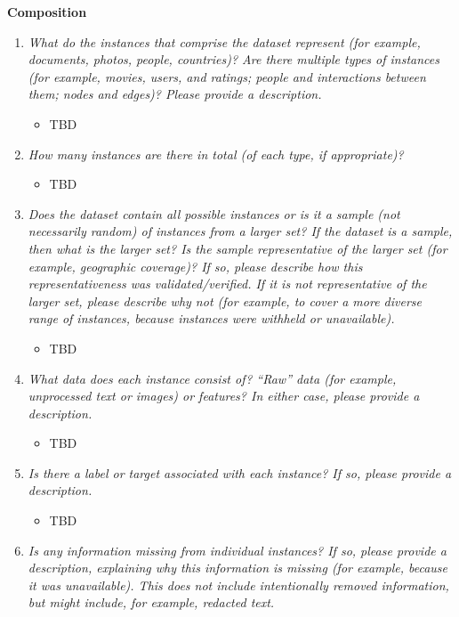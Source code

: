 \documentclass[
  letterpaper,
  DIV=11,
  numbers=noendperiod]{scrartcl}
\providecommand{\tightlist}{%
  \setlength{\itemsep}{0pt}\setlength{\parskip}{0pt}}\usepackage{longtable,booktabs,array}
\begin{document}
\textbf{Composition}

\begin{enumerate}
\def\labelenumi{\arabic{enumi}.}
\tightlist
\item
  \emph{What do the instances that comprise the dataset represent (for
  example, documents, photos, people, countries)? Are there multiple
  types of instances (for example, movies, users, and ratings; people
  and interactions between them; nodes and edges)? Please provide a
  description.}

  \begin{itemize}
  \tightlist
  \item
    TBD
  \end{itemize}
\item
  \emph{How many instances are there in total (of each type, if
  appropriate)?}

  \begin{itemize}
  \tightlist
  \item
    TBD
  \end{itemize}
\item
  \emph{Does the dataset contain all possible instances or is it a
  sample (not necessarily random) of instances from a larger set? If the
  dataset is a sample, then what is the larger set? Is the sample
  representative of the larger set (for example, geographic coverage)?
  If so, please describe how this representativeness was
  validated/verified. If it is not representative of the larger set,
  please describe why not (for example, to cover a more diverse range of
  instances, because instances were withheld or unavailable).}

  \begin{itemize}
  \tightlist
  \item
    TBD
  \end{itemize}
\item
  \emph{What data does each instance consist of? ``Raw'' data (for
  example, unprocessed text or images) or features? In either case,
  please provide a description.}

  \begin{itemize}
  \tightlist
  \item
    TBD
  \end{itemize}
\item
  \emph{Is there a label or target associated with each instance? If so,
  please provide a description.}

  \begin{itemize}
  \tightlist
  \item
    TBD
  \end{itemize}
\item
  \emph{Is any information missing from individual instances? If so,
  please provide a description, explaining why this information is
  missing (for example, because it was unavailable). This does not
  include intentionally removed information, but might include, for
  example, redacted text.}


\end{enumerate}
\end{document}
